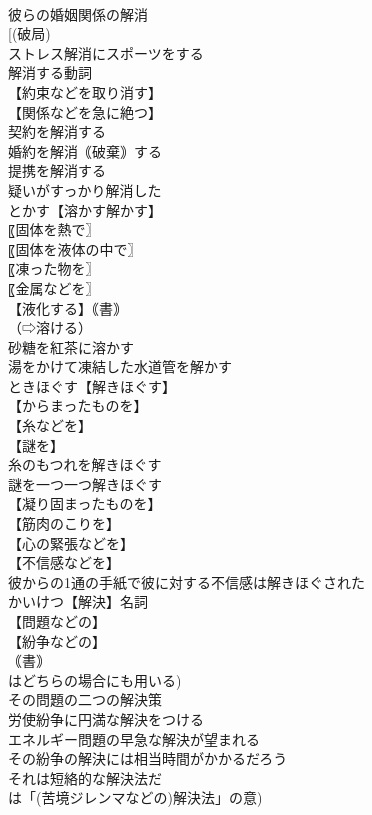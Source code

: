 \documentclass[8pt]{extreport}
\begin{document}
\begin{CJK}{UTF8}{min}
\\	彼らの婚姻関係の解消
\\	[(破局) 
\\	ストレス解消にスポーツをする
\\	解消する動詞
\\	【約束などを取り消す】
\\	【関係などを急に絶つ】
\\	契約を解消する
\\	婚約を解消｟破棄｠する
\\	提携を解消する
\\	疑いがすっかり解消した
\\	とかす【溶かす解かす】
\\	〖固体を熱で〗
\\	〖固体を液体の中で〗
\\	〖凍った物を〗
\\	〖金属などを〗
\\	【液化する】｟書｠
\\	（⇨溶ける）
\\	砂糖を紅茶に溶かす
\\	湯をかけて凍結した水道管を解かす
\\	ときほぐす【解きほぐす】
\\	【からまったものを】
\\	【糸などを】
\\	【謎を】
\\	糸のもつれを解きほぐす
\\	謎を一つ一つ解きほぐす
\\	【凝り固まったものを】
\\	【筋肉のこりを】
\\	【心の緊張などを】
\\	【不信感などを】
\\	彼からの1通の手紙で彼に対する不信感は解きほぐされた
\\	かいけつ【解決】名詞
\\	【問題などの】
\\	【紛争などの】
\\	｟書｠
\\	はどちらの場合にも用いる) 
\\	その問題の二つの解決策
\\	労使紛争に円満な解決をつける
\\	エネルギー問題の早急な解決が望まれる
\\	その紛争の解決には相当時間がかかるだろう
\\	それは短絡的な解決法だ
\\	は「(苦境ジレンマなどの)解決法」の意)

\end{CJK}
\end{document}
